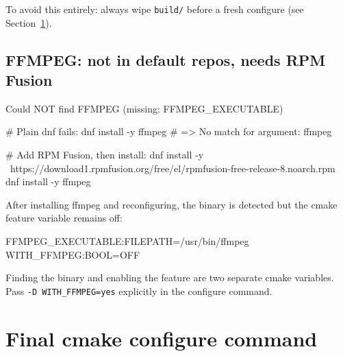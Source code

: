 \documentclass[11pt]{article}
\begin{document}
To avoid this entirely: always wipe \texttt{build/} before a fresh configure
(see Section~\ref{sec:cmake-final}).

\subsection{FFMPEG: not in default repos, needs RPM Fusion}

\begin{codebox}[]
Could NOT find FFMPEG (missing: FFMPEG_EXECUTABLE)
\end{codebox}

\begin{codebox}
\# Plain dnf fails:
dnf install -y ffmpeg
# => No match for argument: ffmpeg

# Add RPM Fusion, then install:
dnf install -y \
    https://download1.rpmfusion.org/free/el/rpmfusion-free-release-8.noarch.rpm
dnf install -y ffmpeg
\end{codebox}

After installing ffmpeg and reconfiguring, the binary is detected but the cmake
feature variable remains off:

\begin{codebox}[]
FFMPEG_EXECUTABLE:FILEPATH=/usr/bin/ffmpeg
WITH_FFMPEG:BOOL=OFF
\end{codebox}

Finding the binary and enabling the feature are two separate cmake variables.
Pass \texttt{-D WITH\_FFMPEG=yes} explicitly in the configure command.

\section{Final cmake configure command}
\label{sec:cmake-final}

\end{document}
